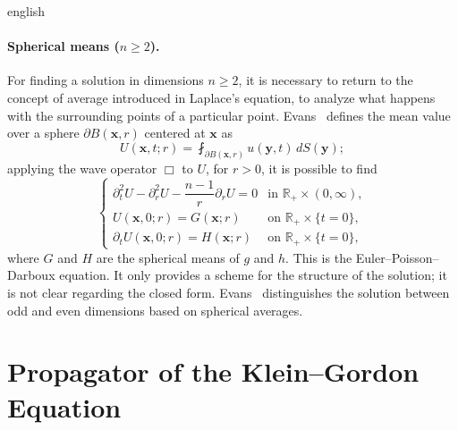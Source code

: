 \documentclass[0000.tex]{subfiles}
\begin{document}
\begin{hyphenrules}{english}
\paragraph{Spherical means ($n\ge2$).}
For finding a solution in dimensions $n\ge2$, it is necessary to return to the concept of average
introduced in Laplace's equation, to analyze what happens with the surrounding points of a particular
point. Evans~\cite{evans2010} defines the mean value over a sphere $\partial B(\mathbf{x},r)$ centered at $\mathbf{x}$ as
\begin{equation}
  U(\mathbf{x},t;r)=\fint_{\partial B(\mathbf{x},r)}u(\mathbf{y},t)\,d S(\mathbf{y});
  \label{eq:spherical-mean}
\end{equation}
applying the wave operator $\Box$ to $U$, for $r>0$, it is possible to find
\begin{equation}
  \begin{cases}
    \partial_t^2U-\partial_r^2U-\dfrac{n-1}{r}\partial_rU=0 & \text{in } \mathbb{R}_+\times(0,\infty),\\
    U(\mathbf{x},0;r)=G(\mathbf{x};r) & \text{on } \mathbb{R}_+\times\{t=0\},\\
    \partial_tU(\mathbf{x},0;r)=H(\mathbf{x};r) & \text{on } \mathbb{R}_+\times\{t=0\},
  \end{cases}
  \label{eq:epd}
\end{equation}
where $G$ and $H$ are the spherical means of $g$ and $h$. This is the Euler--Poisson--Darboux equation.
It only provides a scheme for the structure of the solution; it is not clear regarding the closed form.
Evans~\cite{evans2010} distinguishes the solution between odd and even dimensions based on spherical
averages.

\section{Propagator of the Klein--Gordon Equation}\label{app-sec:kg-propagator}


\end{hyphenrules}
\end{document}
